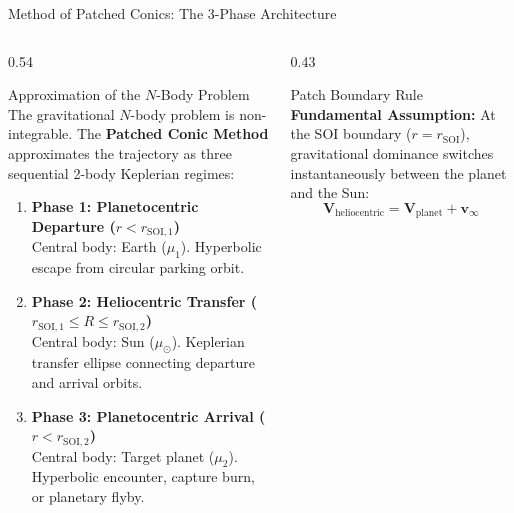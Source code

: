 \documentclass[aspectratio=169, 10pt]{beamer}
\begin{document}
\begin{frame}{Method of Patched Conics: The 3-Phase Architecture}
    \begin{columns}[t]
        \begin{column}{0.54\textwidth}
            \begin{block}{Approximation of the $N$-Body Problem}
                \scriptsize
                The gravitational $N$-body problem is non-integrable. The \textbf{Patched Conic Method} approximates the trajectory as three sequential 2-body Keplerian regimes:
                \begin{enumerate}\setlength{\itemsep}{2pt}\setlength{\topsep}{1pt}
                    \item \textbf{Phase 1: Planetocentric Departure ($r < r_{\text{SOI},1}$)} \\
                    Central body: Earth ($\mu_1$). Hyperbolic escape from circular parking orbit.
                    \item \textbf{Phase 2: Heliocentric Transfer ($r_{\text{SOI},1} \le R \le r_{\text{SOI},2}$)} \\
                    Central body: Sun ($\mu_\odot$). Keplerian transfer ellipse connecting departure and arrival orbits.
                    \item \textbf{Phase 3: Planetocentric Arrival ($r < r_{\text{SOI},2}$)} \\
                    Central body: Target planet ($\mu_2$). Hyperbolic encounter, capture burn, or planetary flyby.
                \end{enumerate}
            \end{block}
        \end{column}

        \begin{column}{0.43\textwidth}
            \begin{block}{Patch Boundary Rule}
                \scriptsize
                \textbf{Fundamental Assumption:} At the SOI boundary ($r = r_{\text{SOI}}$), gravitational dominance switches instantaneously between the planet and the Sun:
                \vspace{-0.08cm}
                \begin{equation*}
                    \mathbf{V}_{\text{heliocentric}} = \mathbf{V}_{\text{planet}} + \mathbf{v}_{\infty}
                \end{equation*}
            \end{block}


\end{column}
\end{columns}
\end{frame}
\end{document}
